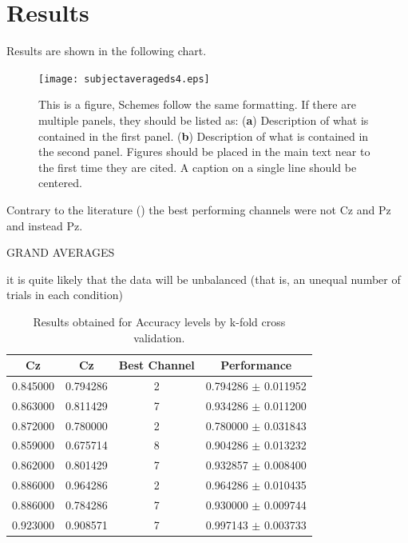 \documentclass[entropy,article,submit,moreauthors,pdftex,10pt,a4paper]{mdpi}
\begin{document}
\section{Results}

Results are shown in the following chart.

\begin{figure}[H]
\centering
\texttt{[image: subjectaverageds4.eps]}
\caption{This is a figure, Schemes follow the same formatting. If there are multiple panels, they should be listed as: (\textbf{a}) Description of what is contained in the first panel. (\textbf{b}) Description of what is contained in the second panel. Figures should be placed in the main text near to the first time they are cited. A caption on a single line should be centered.}
\end{figure}

Contrary to the literature (\citep{Huggins2016,Jure2016}) the best performing channels were not Cz and Pz and instead Pz.

GRAND AVERAGES

it is quite likely that the data will be unbalanced (that is, an unequal number of trials in each condition)

\begin{table}[H]
\caption{Results obtained for Accuracy levels by k-fold cross validation.}
\centering
\begin{tabular}{cccc}
\toprule
\textbf{Cz}	& \textbf{Cz}	& \textbf{Best Channel}	& \textbf{Performance}\\
\midrule
0.845000     & 0.794286 & 2 & 0.794286 $\pm$ 0.011952 \\
0.863000     & 0.811429 & 7 & 0.934286 $\pm$ 0.011200 \\
0.872000     & 0.780000 & 2 & 0.780000 $\pm$ 0.031843 \\
0.859000     & 0.675714 & 8 & 0.904286 $\pm$ 0.013232 \\
0.862000     & 0.801429 & 7 & 0.932857 $\pm$ 0.008400 \\
0.886000     & 0.964286 & 2 & 0.964286 $\pm$ 0.010435 \\
0.886000     & 0.784286 & 7 & 0.930000 $\pm$ 0.009744 \\
0.923000     & 0.908571 & 7 & 0.997143 $\pm$ 0.003733 \\
\bottomrule
\end{tabular}
\end{table}
\end{document}
